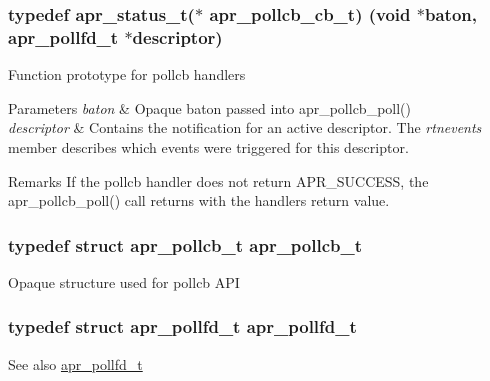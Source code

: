 \subsubsection[{\texorpdfstring{apr\+\_\+pollcb\+\_\+cb\+\_\+t}{apr_pollcb_cb_t}}]{\setlength{\rightskip}{0pt plus 5cm}typedef {\bf apr\+\_\+status\+\_\+t}($\ast$ apr\+\_\+pollcb\+\_\+cb\+\_\+t) ({\bf void} $\ast${\bf baton}, {\bf apr\+\_\+pollfd\+\_\+t} $\ast${\bf descriptor})}\hypertarget{group__apr__poll_ga1dcd8c87e233dbf105e83d50ef601f55}{}\label{group__apr__poll_ga1dcd8c87e233dbf105e83d50ef601f55}
Function prototype for pollcb handlers 
\begin{DoxyParams}{Parameters}
{\em baton} & Opaque baton passed into apr\+\_\+pollcb\+\_\+poll() \\
\hline
{\em descriptor} & Contains the notification for an active descriptor. The {\itshape rtnevents} member describes which events were triggered for this descriptor. \\
\hline
\end{DoxyParams}
\begin{DoxyRemark}{Remarks}
If the pollcb handler does not return A\+P\+R\+\_\+\+S\+U\+C\+C\+E\+SS, the apr\+\_\+pollcb\+\_\+poll() call returns with the handler\textquotesingle{}s return value. 
\end{DoxyRemark}
\subsubsection[{\texorpdfstring{apr\+\_\+pollcb\+\_\+t}{apr_pollcb_t}}]{\setlength{\rightskip}{0pt plus 5cm}typedef struct {\bf apr\+\_\+pollcb\+\_\+t} {\bf apr\+\_\+pollcb\+\_\+t}}\hypertarget{group__apr__poll_gae382e39bdf0c5a02fca7da3944bece08}{}\label{group__apr__poll_gae382e39bdf0c5a02fca7da3944bece08}
Opaque structure used for pollcb A\+PI 
\subsubsection[{\texorpdfstring{apr\+\_\+pollfd\+\_\+t}{apr_pollfd_t}}]{\setlength{\rightskip}{0pt plus 5cm}typedef struct {\bf apr\+\_\+pollfd\+\_\+t} {\bf apr\+\_\+pollfd\+\_\+t}}\hypertarget{group__apr__poll_ga0c89b184cbe2337e44207f1ad245129b}{}\label{group__apr__poll_ga0c89b184cbe2337e44207f1ad245129b}
\begin{DoxySeeAlso}{See also}
\hyperlink{structapr__pollfd__t}{apr\+\_\+pollfd\+\_\+t} 
\end{DoxySeeAlso}
